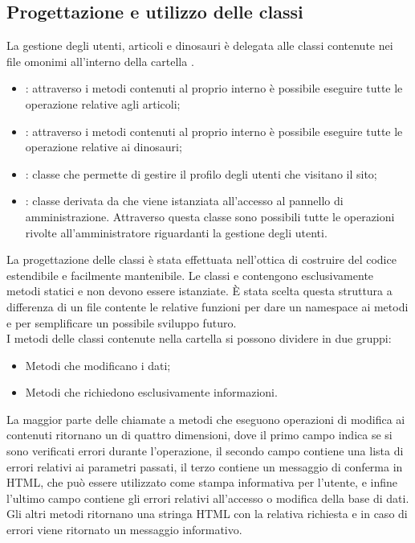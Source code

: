\documentclass[12pt]{article}
\begin{document}
	\subsection{Progettazione e utilizzo delle classi}
	 La gestione degli utenti, articoli e dinosauri è delegata alle classi contenute nei file omonimi all'interno della cartella .
	 \begin{itemize} 
	 	\item {}: attraverso i metodi contenuti al proprio interno è possibile eseguire tutte le operazione relative agli articoli;
	 	\item {}: attraverso i metodi contenuti al proprio interno è possibile eseguire tutte le operazione relative ai dinosauri;
	 	\item {}: classe che permette di gestire il profilo degli utenti che visitano il sito;
	 	\item {}: classe derivata da  che viene istanziata all'accesso al pannello di amministrazione. Attraverso questa classe sono possibili tutte le operazioni rivolte all'amministratore riguardanti la gestione degli utenti.
 	 \end{itemize}
  
     La progettazione delle classi è stata effettuata nell'ottica di costruire del codice estendibile e facilmente mantenibile. Le classi  e  contengono esclusivamente metodi statici e non devono essere istanziate. È stata scelta questa struttura a differenza di un file contente le relative funzioni per dare un namespace ai metodi e per semplificare un possibile sviluppo futuro. \\
     
     \noindent I metodi delle classi contenute nella cartella  si possono dividere in due gruppi:
     
     \begin{itemize}
     	\item Metodi che modificano i dati;
     	\item Metodi che richiedono esclusivamente informazioni.
     \end{itemize}
 
      La maggior parte delle chiamate a metodi che eseguono operazioni di modifica ai contenuti ritornano un  di quattro dimensioni, dove il primo campo indica se si sono verificati errori durante l'operazione, il secondo campo contiene una lista di errori relativi ai parametri passati, il terzo contiene un messaggio di conferma in HTML, che può essere utilizzato come stampa informativa per l'utente, e infine l'ultimo campo contiene gli errori relativi all'accesso o modifica della base di dati. Gli altri metodi ritornano una stringa HTML con la relativa richiesta e in caso di errori viene ritornato un messaggio informativo. 
     
\end{document}
